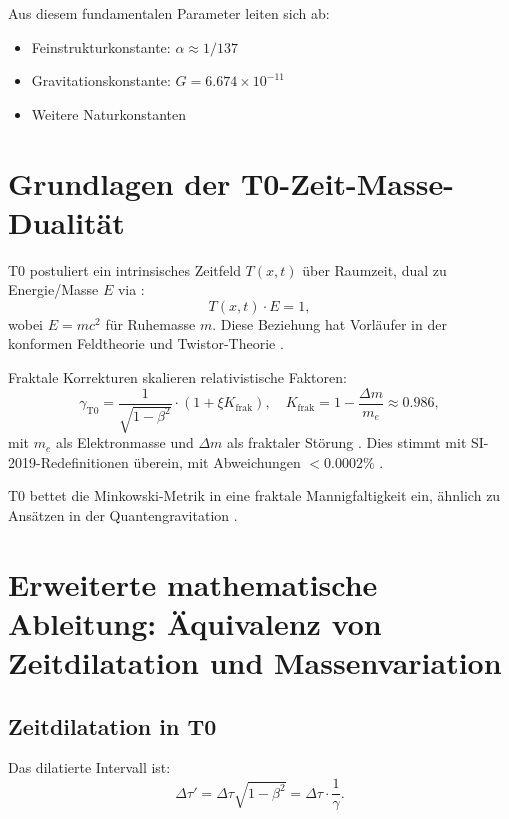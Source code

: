 	Aus diesem fundamentalen Parameter leiten sich ab:
	\begin{itemize}
		\item Feinstrukturkonstante: $\alpha \approx 1/137$ \cite{pascher2025alpha}
		\item Gravitationskonstante: $G = 6.674 \times 10^{-11}$ \cite{pascher2025gravity}
		\item Weitere Naturkonstanten \cite{weinberg2008}
	\end{itemize}
	
	\section{Grundlagen der T0-Zeit-Masse-Dualität}
	T0 postuliert ein intrinsisches Zeitfeld $T(x,t)$ über Raumzeit, dual zu Energie/Masse $E$ via \cite{pascher2025qm, penrose2004}:
	\begin{equation}
		T(x,t) \cdot E = 1,
	\end{equation}
	wobei $E = m c^2$ für Ruhemasse $m$. Diese Beziehung hat Vorläufer in der konformen Feldtheorie \cite{francesco1997} und Twistor-Theorie \cite{penrose1967}.
	
	Fraktale Korrekturen skalieren relativistische Faktoren:
	\begin{equation}
		\gamma_\text{T0} = \frac{1}{\sqrt{1 - \beta^2}} \cdot (1 + \xi K_\text{frak}), \quad K_\text{frak} = 1 - \frac{\Delta m}{m_e} \approx 0.986,
	\end{equation}
	mit $m_e$ als Elektronmasse und $\Delta m$ als fraktaler Störung \cite{pascher2025si}. Dies stimmt mit SI-2019-Redefinitionen überein, mit Abweichungen $<0.0002\%$ \cite{codata2019, newell2018}.
	
	T0 bettet die Minkowski-Metrik in eine fraktale Mannigfaltigkeit ein, ähnlich zu Ansätzen in der Quantengravitation \cite{rovelli2004, thiemann2007}.
	
	\section{Erweiterte mathematische Ableitung: Äquivalenz von Zeitdilatation und Massenvariation}
	
	\subsection{Zeitdilatation in T0}
	Das dilatierte Intervall ist:
	\begin{equation}
		\Delta \tau' = \Delta \tau \sqrt{1 - \beta^2} = \Delta \tau \cdot \frac{1}{\gamma}.
	\end{equation}
	
